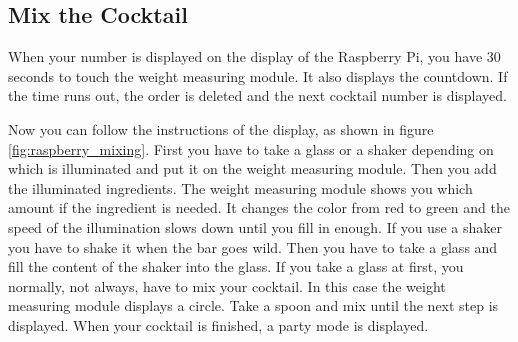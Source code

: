 \documentclass{acm_proc_article-sp}
\begin{document}
 \subsection{Mix the Cocktail}
When your number is displayed on the display of the Raspberry Pi, you have 30 seconds to touch the weight measuring module. It also displays the countdown. If the time runs out, the order is deleted and the next cocktail number is displayed. 
\\

\begin{minipage}{\linewidth}%
\label{fig:raspberry_mixing}%
\end{minipage}
Now you can follow the instructions of the display, as shown in figure \ref{fig:raspberry_mixing}. First you have to take a glass or a shaker depending on which is illuminated and put it on the weight measuring module. Then you add the illuminated ingredients. The weight measuring module shows you which amount if the ingredient is needed. It changes the color from red to green and the speed of the illumination slows down until you fill in enough. If you use a shaker you have to shake it when the bar goes wild. Then you have to take a glass and fill the content of the shaker into the glass. If you take a glass at first, you normally, not always, have to mix your cocktail. In this case the weight measuring module displays a circle. Take a spoon and mix until the next step is displayed. When your cocktail is finished, a party mode is displayed. 
\end{document}
